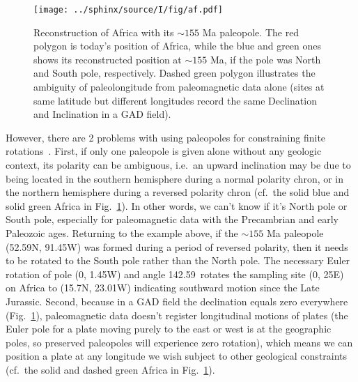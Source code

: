 \begin{figure}[!ht]
  \centering
    \texttt{[image: ../sphinx/source/I/fig/af.pdf]}
  \captionsetup{width=.95\textwidth}
  \caption[The hemispheric ambiguity and absolute paleolongitude indeterminacy
  with a single paleomagnetic pole (paleopole)]{Reconstruction of Africa with
  its ${\sim}155$ Ma paleopole. The red polygon is today's position of Africa,
  while the blue and green ones shows its reconstructed position at ${\sim}155$
  Ma, if the pole was North and South pole, respectively. Dashed green polygon
  illustrates the ambiguity of paleolongitude from paleomagnetic data alone
  (sites at same latitude but different longitudes record the same Declination
  and Inclination in a GAD field).}\label{Fig:chap_intro_reconstructpole}
\end{figure}

However, there are 2 problems with using paleopoles for constraining finite
rotations~\citep{T20}. First, if only one paleopole is given alone without any
geologic context, its polarity can be ambiguous, i.e.\ an upward inclination may
be due to being located in the southern hemisphere during a normal polarity
chron, or in the northern hemisphere during a reversed polarity chron (cf.\ the
solid blue and solid green Africa in Fig.~\ref{Fig:chap_intro_reconstructpole}).
In other words, we can't know if it's North pole or South pole, especially for
paleomagnetic data with the Precambrian and early Paleozoic ages. Returning to
the example above, if the ${\sim}155$ Ma paleopole (52.59\degree{}N,
91.45\degree{}W) was formed during a period of reversed polarity, then it needs
to be rotated to the South pole rather than the North pole. The necessary Euler
rotation of pole (0\degree, 1.45\degree{}W) and angle 142.59\degree\ rotates the
sampling site (0\degree, 25\degree{}E) on Africa to (15.7\degree{}N,
23.01\degree{}W) indicating southward motion since the Late Jurassic. Second,
because in a GAD field the declination equals zero everywhere
(Fig.~\ref{Fig:chap_intro_reconstructpole}), paleomagnetic data doesn't register
longitudinal motions of plates (the Euler pole for a plate moving purely to the
east or west is at the geographic poles, so preserved paleopoles will experience
zero rotation), which means we can position a plate at any longitude we wish
subject to other geological constraints (cf.\ the solid and dashed green Africa
in Fig.~\ref{Fig:chap_intro_reconstructpole}).

